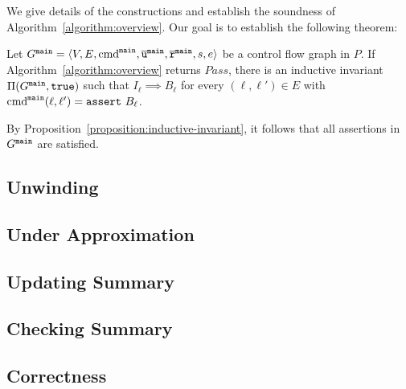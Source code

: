 
We give details of the constructions and establish the soundness of
Algorithm~\ref{algorithm:overview}. Our goal is to establish the
following theorem:

\begin{theorem}
  Let $G^{\mathtt{{main}}} = \langle V, E, \textmd{cmd}^{\mathtt{{main}}} , \overline{\mathtt{u}}^{\mathtt{{main}}}, \overline{\mathtt{r}}^{\mathtt{{main}}},s,e \rangle$ be a control flow
  graph in $P$. If Algorithm~\ref{algorithm:overview} returns
  $\mathit{Pass}$, there is an inductive invariant $\Pi (G^{\mathtt{{main}}}, \mathtt{true})$
  such that $I_{\ell} \implies B_{\ell}$ for every $(\ell, \ell') \in
  E$ with $\textmd{cmd}^{\mathtt{{main}}} (\ell, \ell') = \mathtt{assert\ } B_{\ell}$.
  \label{theorem:soundness}
\end{theorem}
By Proposition~\ref{proposition:inductive-invariant}, it follows that
all assertions in $G^{\mathtt{{main}}}$ are satisfied.

\subsection{Unwinding}
\label{subsection:unwinding}


\subsection{Under Approximation}
\label{subsection:under-approximation}


\subsection{Updating Summary}
\label{subsection:updating-summary}


\subsection{Checking Summary}
\label{subsection:checking-summary}


\subsection{Correctness}
\label{subsection:correctness}

